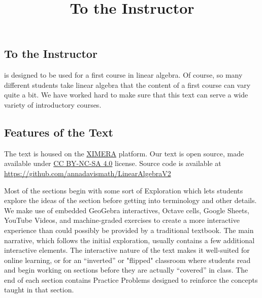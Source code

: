 \documentclass{ximera}
\title{To the Instructor} \license{CC BY-NC-SA 4.0}
\begin{document}
\begin{abstract}
\end{abstract}
\maketitle

\begin{onlineOnly}
\section*{To the Instructor}
\end{onlineOnly}

 is designed to be used for a first course in linear algebra.  Of course, so many different students take linear algebra that the content of a first course can vary quite a bit.  We have worked hard to make sure that this text can serve a wide variety of introductory courses. 

\subsection*{Features of the Text}

The text is housed on the \href{https://ximera.osu.edu/}{XIMERA} platform. %
Our text is open source, made available under \href{https://creativecommons.org/licenses/by-sa/4.0/deed.en}{CC BY-NC-SA 4.0} license.  Source code is available at \href{https://github.com/annadavismath/LinearAlgebraV2}{https://github.com/annadavismath/LinearAlgebraV2}

Most of the sections begin with some sort of Exploration which lets students explore the ideas of the section before getting into terminology and other details.  We make use of embedded GeoGebra interactives, Octave cells, Google Sheets, YouTube Videos, and machine-graded exercises to create a more interactive experience than could possibly be provided by a traditional textbook.  The main narrative, which follows the initial exploration, usually contains a few additional interactive elements.  The interactive nature of the text %
makes it well-suited for online learning, or for an ``inverted'' or "flipped" classroom where students read and begin working on sections before they are actually ``covered'' in class.  The end of each section contains Practice Problems designed to reinforce the concepts taught in that section.
\end{document}
